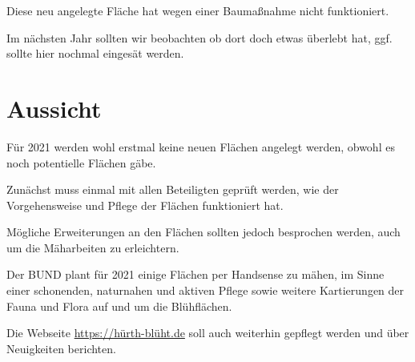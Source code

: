 \documentclass[10pt]{article}
\begin{document}
Diese neu angelegte Fläche hat wegen einer Baumaßnahme nicht funktioniert.

Im nächsten Jahr sollten wir beobachten ob dort doch etwas überlebt hat, ggf. sollte hier nochmal eingesät werden.

\clearpage
\section{Aussicht}
Für 2021 werden wohl erstmal keine neuen Flächen angelegt werden, obwohl es noch potentielle Flächen gäbe.

Zunächst muss einmal mit allen Beteiligten geprüft werden, wie der Vorgehensweise und Pflege der Flächen funktioniert hat.

Mögliche Erweiterungen an den Flächen sollten jedoch besprochen werden, auch um die Mäharbeiten zu erleichtern.

Der BUND plant für 2021 einige Flächen per Handsense zu mähen, im Sinne einer schonenden, naturnahen und aktiven Pflege sowie weitere Kartierungen der Fauna und Flora auf und um die Blühflächen.

Die Webseite \href{https://hürth-blüht.de}{https://hürth-blüht.de} soll auch weiterhin gepflegt werden und über Neuigkeiten berichten.
\end{document}
